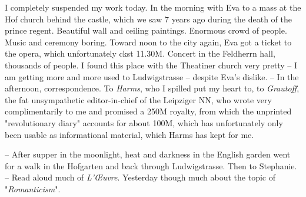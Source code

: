 
I completely suspended my work today. In the morning with Eva to a mass at the Hof church behind the castle, which we saw 7 years ago  during the death of the prince regent. Beautiful  wall and ceiling paintings. Enormous crowd of people. Music and ceremony boring. Toward noon to the city again, Eva got a ticket to the opera, which unfortunately ckst 11.30M. Concert in the Feldherrn hall, thousands of people. I found this place with the Theatiner church very pretty -- I am getting more and more used to Ludwigstrasse -- despite Eva's dislike. -- In the afternoon, correspondence. To \textit{Harms}, who I spilled put my heart to, to \textit{Grautoff}, the fat unsympathetic editor-in-chief of the Leipziger NN, who wrote very complimentarily to me and promised a 250M royalty, from which the unprinted "revolutionary diary" accounts for about 100M, which has unfortunately only been usable as informational material, which Harms has kept for me.

-- After supper in the moonlight, heat and darkness in the English garden went for a walk in the Hofgarten and back through Ludwigstrasse. Then to Stephanie. -- Read aloud much of \textit{L'\OE uvre}. Yesterday though much about the topic of "\textit{Romanticism}".    